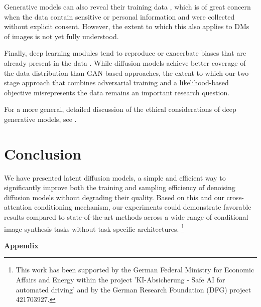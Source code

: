 \documentclass[10pt,twocolumn,letterpaper]{article}
\newcommand\blfootnote[1]{%
  \begingroup
  \renewcommand\thefootnote{}\footnote{#1}%
  \addtocounter{footnote}{-1}%
  \endgroup
}
\begin{document}
Generative models can also reveal their training data \cite{carlini2021extracting, tinsley2021face}, 
which is of great concern when the data contain sensitive or personal information 
and were collected without explicit consent. 
However, the extent to which this also applies to DMs of images is not yet fully understood.

Finally, deep learning modules tend to reproduce or exacerbate biases that are already present in the data \cite{torralba2011unbiased, jain2020imperfect, esser2020note}. 
While diffusion models achieve better coverage of the data distribution than \eg GAN-based approaches, 
the extent to which our two-stage approach that combines adversarial training and a likelihood-based objective 
misrepresents the data remains an important research question.

For a more general, detailed discussion of the ethical considerations of deep generative models, see \eg \cite{denton2021workshop}.

\vspace{-0.5em}
\section{Conclusion}
\label{sec:conclusion}
\enlargethispage{\baselineskip}
\vspace{-0.5em}
We have presented latent diffusion models, a simple and efficient way to significantly improve both the
training and sampling efficiency of denoising diffusion models without
degrading their quality. Based on this and our cross-attention
conditioning mechanism, our experiments could demonstrate favorable results
compared to state-of-the-art methods across a wide range of conditional image
synthesis tasks without task-specific architectures. 
\blfootnote{This work has been supported by the German Federal Ministry for Economic Affairs and Energy within the project ’KI-Absicherung - Safe AI for automated driving’ and by the German Research Foundation (DFG) project 421703927.}
%

%
%
%
%
%
%
%
%


\newpage

\FloatBarrier

%
{\small


}


\newpage

%
%
\FloatBarrier

\onecolumn

\appendix

\vspace{-2cm}
\begin{center}
\LARGE\textbf{Appendix}
\end{center}
\enlargethispage{\baselineskip}
%
\landscapestune
\texttoimgconvsamples
\newpage
%
%
%
\FloatBarrier
\end{document}
